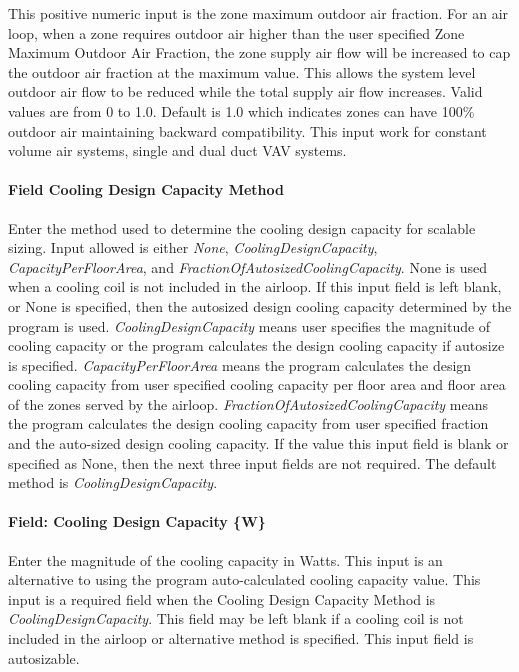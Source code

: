 This positive numeric input is the zone maximum outdoor air fraction. For an air loop, when a zone requires outdoor air higher than the user specified Zone Maximum Outdoor Air Fraction, the zone supply air flow will be increased to cap the outdoor air fraction at the maximum value. This allows the system level outdoor air flow to be reduced while the total supply air flow increases. Valid values are from 0 to 1.0. Default is 1.0 which indicates zones can have 100\% outdoor air maintaining backward compatibility. This input work for constant volume air systems, single and dual duct VAV systems.

\paragraph{Field Cooling Design Capacity Method}\label{field-cooling-design-capacity-method-1}

Enter the method used to determine the cooling design capacity for scalable sizing. Input allowed is either \emph{None}, \emph{CoolingDesignCapacity}, \emph{CapacityPerFloorArea}, and \emph{FractionOfAutosizedCoolingCapacity}. None is used when a cooling coil is not included in the airloop. If this input field is left blank, or None is specified, then the autosized design cooling capacity determined by the program is used. \emph{CoolingDesignCapacity} means user specifies the magnitude of cooling capacity or the program calculates the design cooling capacity if autosize is specified. \emph{CapacityPerFloorArea} means the program calculates the design cooling capacity from user specified cooling capacity per floor area and floor area of the zones served by the airloop. \emph{FractionOfAutosizedCoolingCapacity} means the program calculates the design cooling capacity from user specified fraction and the auto-sized design cooling capacity. If the value this input field is blank or specified as None, then the next three input fields are not required. The default method is \emph{CoolingDesignCapacity}.

\paragraph{Field: Cooling Design Capacity \{W\}}\label{field-cooling-design-capacity-w-1}

Enter the magnitude of the cooling capacity in Watts. This input is an alternative to using the program auto-calculated cooling capacity value. This input is a required field when the Cooling Design Capacity Method is \emph{CoolingDesignCapacity}. This field may be left blank if a cooling coil is not included in the airloop or alternative method is specified. This input field is autosizable.

